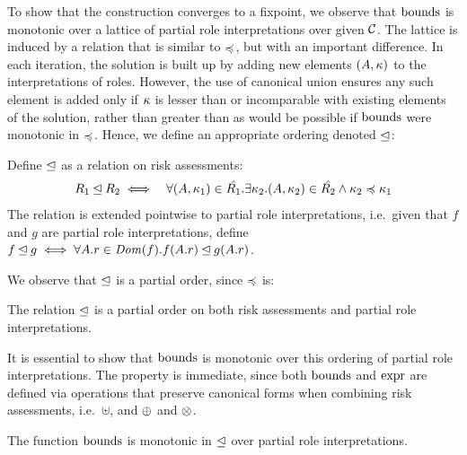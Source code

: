 To show that the construction converges to a fixpoint, we observe that
$\mathrm{bounds}$ is monotonic over a lattice of partial role
interpretations over given $\mathcal{C}$.  The lattice is induced by a
relation that is similar to $\preccurlyeq$, but with an important difference.
In each iteration, the solution is built up by adding
new elements $(A,\kappa)$ to the interpretations of roles.  However,
the use of canonical union ensures any such element is added only if
$\kappa$ is lesser than or incomparable with existing elements of the
solution, rather than greater than as would be possible if $\mathrm{bounds}$
were monotonic in $\preccurlyeq$.  Hence, we define an appropriate ordering
denoted $\unlhd$:
\begin{definition}
Define $\unlhd$ as a relation on risk assessments:
\begin{eqnarray*}
R_1 \unlhd R_2 &\iff& \forall (A,\kappa_1) \in \hat{R_1} . \exists
\kappa_2.  (A,\kappa_2) \in \hat{R_2} \wedge \kappa_2 \preccurlyeq \kappa_1
\end{eqnarray*}
The relation is extended pointwise to partial role interpretations,
i.e.~given that $f$ and $g$ are partial role interpretations, define $f
\unlhd g \iff \forall A.r \in \mathit{Dom}(f) . f(A.r) \unlhd g(A.r)$.
\end{definition}
We observe that $\unlhd$ is a partial order, since $\preccurlyeq$ is:
\begin{lemma}
The relation $\unlhd$ is a partial order on both risk assessments and
partial role interpretations.
\end{lemma} 
It is essential to show that $\mathrm{bounds}$ is monotonic over this ordering
of partial role interpretations.  The property is immediate, since 
both $\mathrm{bounds}$ and $\mathrm{expr}$ are defined via operations that preserve
canonical forms when combining risk assessments, i.e.~$\uplus$, 
and $\oplus$ and $\otimes$.
\begin{lemma}
The function $\mathrm{bounds}$ is monotonic in $\unlhd$ over
partial role interpretations.
\end{lemma}

